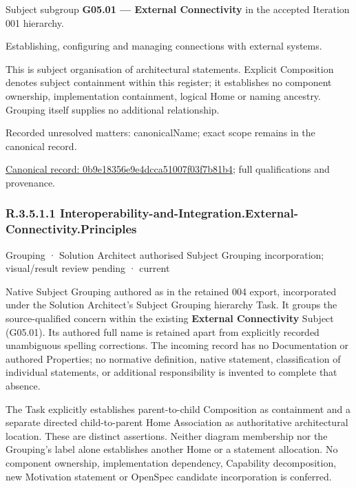 Subject subgroup \textbf{G05.01 — External Connectivity} in the accepted Iteration 001 hierarchy.



Establishing, configuring and managing connections with external systems.



This is subject organisation of architectural statements. Explicit Composition denotes subject containment within this register; it establishes no component ownership, implementation containment, logical Home or naming ancestry. Grouping itself supplies no additional relationship.


{\small Recorded unresolved matters: canonicalName; exact scope remains in the canonical record.}\par
{\footnotesize \href{../../../../continuum/grouping/0b9e18356e9e4dcca51007f03f7b81b4.md}{Canonical record: 0b9e18356e9e4dcca51007f03f7b81b4}; full qualifications and provenance.}\par
\subsubsection*{R.3.5.1.1 Interoperability-and-Integration.External-Connectivity.Principles}
\label{navigation:R.3.5.1.1}

\label{element:011207c2c69f42d7a5c9c7504ffbc951}
{\small Grouping · Solution Architect authorised Subject Grouping incorporation; visual/result review pending · current}\par

Native Subject Grouping authored as \texttt{} in the retained 004 export,
incorporated under the Solution Architect's Subject Grouping hierarchy Task.
It groups the source-qualified \texttt{} concern within
the existing \textbf{External Connectivity} Subject (G05.01). Its authored full name
is retained apart from explicitly recorded unambiguous spelling corrections.
The incoming record has no Documentation or authored Properties; no normative
definition, native statement, classification of individual statements, or
additional responsibility is invented to complete that absence.



The Task explicitly establishes parent-to-child Composition as containment and
a separate directed child-to-parent Home Association as authoritative architectural
location. These are distinct assertions. Neither diagram membership nor the
Grouping's label alone establishes another Home or a statement allocation.
No component ownership, implementation dependency, Capability decomposition,
new Motivation statement or OpenSpec candidate incorporation is conferred.



